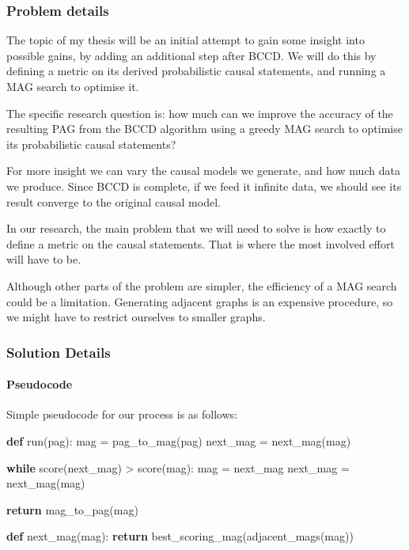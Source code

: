 \documentclass[
]{article}
\newenvironment{Shaded}{}{}
\newcommand{\ControlFlowTok}[1]{\textcolor[rgb]{0.00,0.44,0.13}{\textbf{#1}}}
\newcommand{\KeywordTok}[1]{\textcolor[rgb]{0.00,0.44,0.13}{\textbf{#1}}}
\newcommand{\NormalTok}[1]{#1}
\newcommand{\OperatorTok}[1]{\textcolor[rgb]{0.40,0.40,0.40}{#1}}
\begin{document}
\hypertarget{problem-details}{%
\subsubsection{Problem details}\label{problem-details}}

The topic of my thesis will be an initial attempt to gain some insight
into possible gains, by adding an additional step after BCCD. We will do
this by defining a metric on its derived probabilistic causal
statements, and running a MAG search to optimise it.

The specific research question is: how much can we improve the accuracy
of the resulting PAG from the BCCD algorithm using a greedy MAG search
to optimise its probabilistic causal statements?

For more insight we can vary the causal models we generate, and how much
data we produce. Since BCCD is complete, if we feed it infinite data, we
should see its result converge to the original causal model.

In our research, the main problem that we will need to solve is how
exactly to define a metric on the causal statements. That is where the
most involved effort will have to be.

Although other parts of the problem are simpler, the efficiency of a MAG
search could be a limitation. Generating adjacent graphs is an expensive
procedure, so we might have to restrict ourselves to smaller graphs.

\hypertarget{solution-details}{%
\subsubsection{Solution Details}\label{solution-details}}

\hypertarget{pseudocode}{%
\paragraph{Pseudocode}\label{pseudocode}}

Simple pseudocode for our process is as follows:

\begin{Shaded}
\begin{Highlighting}[]
\KeywordTok{def}\NormalTok{ run(pag):}
\NormalTok{  mag }\OperatorTok{=}\NormalTok{ pag\_to\_mag(pag)}
\NormalTok{  next\_mag }\OperatorTok{=}\NormalTok{ next\_mag(mag)}

  \ControlFlowTok{while}\NormalTok{ score(next\_mag) }\OperatorTok{\textgreater{}}\NormalTok{ score(mag):}
\NormalTok{    mag }\OperatorTok{=}\NormalTok{ next\_mag}
\NormalTok{    next\_mag }\OperatorTok{=}\NormalTok{ next\_mag(mag)}

  \ControlFlowTok{return}\NormalTok{ mag\_to\_pag(mag)}

\KeywordTok{def}\NormalTok{ next\_mag(mag):}
  \ControlFlowTok{return}\NormalTok{ best\_scoring\_mag(adjacent\_mags(mag))}
\end{Highlighting}
\end{Shaded}
\end{document}
